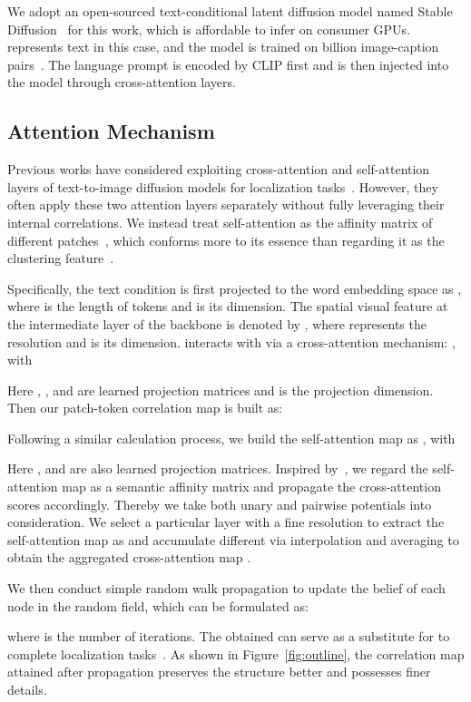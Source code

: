 \documentclass[letterpaper]{article} \usepackage[submission]{aaai24}  \usepackage{times}  \usepackage{helvet}  \usepackage{courier}  \usepackage[hyphens]{url}  \usepackage{graphicx} \urlstyle{rm} \def\UrlFont{\rm}  \usepackage{natbib}  \usepackage{caption} \frenchspacing  \setlength{\pdfpagewidth}{8.5in} \setlength{\pdfpageheight}{11in} \usepackage{algorithm}
\begin{document}
We adopt an open-sourced text-conditional latent diffusion model named Stable Diffusion~\cite{stablediffusion} for this work, which is affordable to infer on consumer GPUs.
 represents text in this case, and the model is trained on  billion image-caption pairs~\cite{LAION5B}.
The language prompt is encoded by CLIP first and is then injected into the model through cross-attention layers.

\subsection{Attention Mechanism}
\label{sec:attention}

Previous works have considered exploiting cross-attention and self-attention layers of text-to-image diffusion models for localization tasks~\cite{p2p, Mix-and-Match}.
However, they often apply these two attention layers separately without fully leveraging their internal correlations.
We instead treat self-attention as the affinity matrix of different patches~\cite{affinitynet}, which conforms more to its essence than regarding it as the clustering feature~\cite{Mix-and-Match}.


Specifically, the text condition  is first projected to the word embedding space as , where  is the length of tokens and  is its dimension.
The spatial visual feature at the intermediate layer  of the backbone is denoted by , where  represents the resolution and  is its dimension.
 interacts with  via a cross-attention mechanism: , with

Here , , and  are learned projection matrices and  is the projection dimension.
Then our patch-token correlation map is built as:


Following a similar calculation process, we build the self-attention map as , with

Here , and  are also learned projection matrices.
Inspired by~\cite{affinitynet, irnet}, we regard the self-attention map as a semantic affinity matrix and propagate the cross-attention scores accordingly.
Thereby we take both unary and pairwise potentials into consideration.
We select a particular layer with a fine resolution  to extract the self-attention map as  and accumulate different  via interpolation and averaging to obtain the aggregated cross-attention map .

We then conduct simple random walk propagation to update the belief of each node in the random field, which can be formulated as:

where  is the number of iterations. 
The obtained  can serve as a substitute for  to complete localization tasks~\cite{p2p}.
As shown in Figure~\ref{fig:outline}, the correlation map attained after propagation preserves the structure better and possesses finer details.
\end{document}
